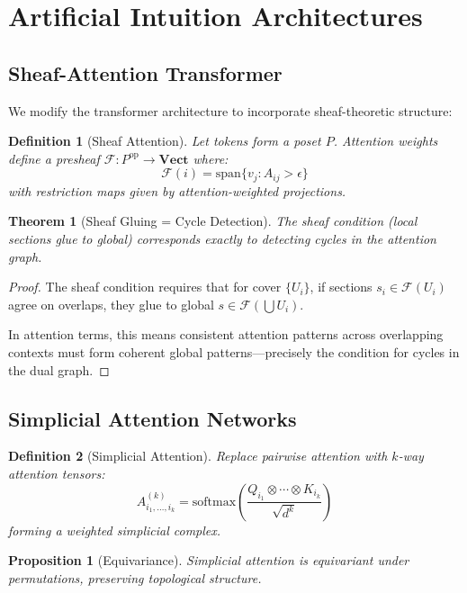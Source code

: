 \documentclass[11pt]{article}
\newtheorem{definition}{Definition}[section]
\newtheorem{theorem}{Theorem}[section]
\newtheorem{proposition}{Proposition}[section]
\begin{document}
\section{Artificial Intuition Architectures}

\subsection{Sheaf-Attention Transformer}

We modify the transformer architecture to incorporate sheaf-theoretic structure:

\begin{definition}[Sheaf Attention]
Let tokens form a poset $P$. Attention weights define a presheaf $\mathcal{F}: P^{\text{op}} \to \mathbf{Vect}$ where:
$$\mathcal{F}(i) = \text{span}\{v_j : A_{ij} > \epsilon\}$$
with restriction maps given by attention-weighted projections.
\end{definition}

\begin{theorem}[Sheaf Gluing = Cycle Detection]
The sheaf condition (local sections glue to global) corresponds exactly to detecting cycles in the attention graph.
\end{theorem}

\begin{proof}
The sheaf condition requires that for cover $\{U_i\}$, if sections $s_i \in \mathcal{F}(U_i)$ agree on overlaps, they glue to global $s \in \mathcal{F}(\bigcup U_i)$.

In attention terms, this means consistent attention patterns across overlapping contexts must form coherent global patterns—precisely the condition for cycles in the dual graph.
\end{proof}

\subsection{Simplicial Attention Networks}

\begin{definition}[Simplicial Attention]
Replace pairwise attention with $k$-way attention tensors:
$$A^{(k)}_{i_1,\ldots,i_k} = \text{softmax}\left(\frac{Q_{i_1} \otimes \cdots \otimes K_{i_k}}{\sqrt{d^k}}\right)$$
forming a weighted simplicial complex.
\end{definition}

\begin{proposition}[Equivariance]
Simplicial attention is equivariant under permutations, preserving topological structure.
\end{proposition}
\end{document}
